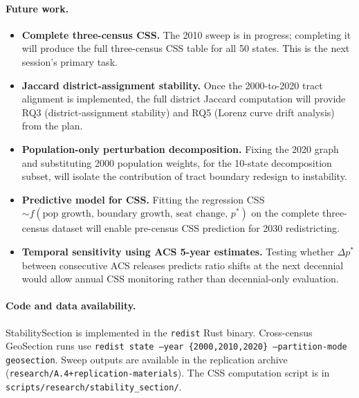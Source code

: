 \paragraph{Future work.}
\begin{itemize}
\item \textbf{Complete three-census CSS.}
  The 2010 sweep is in progress; completing it will produce the full
  three-census CSS table for all 50 states.
  This is the next session's primary task.

\item \textbf{Jaccard district-assignment stability.}
  Once the 2000-to-2020 tract alignment is implemented, the full district
  Jaccard computation will provide RQ3 (district-assignment stability)
  and RQ5 (Lorenz curve drift analysis) from the plan.

\item \textbf{Population-only perturbation decomposition.}
  Fixing the 2020 graph and substituting 2000 population weights, for the
  10-state decomposition subset, will isolate the contribution of tract
  boundary redesign to instability.

\item \textbf{Predictive model for CSS.}
  Fitting the regression CSS $\sim f(\text{pop growth, boundary growth,
  seat change, } p^*)$ on the complete three-census dataset will enable
  pre-census CSS prediction for 2030 redistricting.

\item \textbf{Temporal sensitivity using ACS 5-year estimates.}
  Testing whether $\Delta p^*$ between consecutive ACS releases predicts
  ratio shifts at the next decennial would allow annual CSS monitoring
  rather than decennial-only evaluation.
\end{itemize}

\paragraph{Code and data availability.}
StabilitySection is implemented in the \texttt{redist} Rust binary.
Cross-census GeoSection runs use \texttt{redist state --year \{2000,2010,2020\}
--partition-mode geosection}.
Sweep outputs are available in the replication archive
(\texttt{research/A.4+replication-materials}).
The CSS computation script is in \texttt{scripts/research/stability\_section/}.
